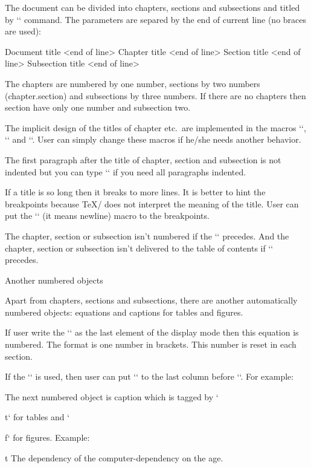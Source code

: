 The document can be divided into chapters, sections and subsections and titled
by `\tit` command. The parameters are separed by the end of current line (no
braces are used):

\begtt
\tit Document title <end of line>
\chap Chapter title <end of line>
\sec Section title <end of line>
\secc Subsection title <end of line>
\endtt

The chapters are numbered by one number, sections by two numbers
(chapter.section) and subsections by three numbers. If there are no chapters
then section have only one number and subsection two.

The implicit design of the titles of chapter etc.\ are implemented in the
macros `\printchap`, `\printsec` and `\printsecc`. User can simply change
these macros if he/she needs another behavior.

The first paragraph after the title of chapter, section and subsection is
not indented but you can type `\let\firstnoindent=\relax` if you need all
paragraphs indented.

If a title is so long then it breaks to more lines. It is better to hint the
breakpoints because \TeX/ does not interpret the meaning of the title.
User can put the `\nl` (it means newline) macro to the breakpoints.

The chapter, section or subsection isn't numbered if the `\nonum` precedes.
And the chapter, section or subsection isn't delivered to the table of
contents if `\notoc` precedes.


\sec Another numbered objects

Apart from chapters, sections and subsections, there are another
automatically numbered objects: equations and captions for tables and
figures.

If user write the `\eqmark` as the last element of the display mode then
this equation is numbered. The format is one number in brackets. This number
is reset in each section. 

If the `\eqalignno` is used, then user can put `\eqmark` to the last column
before `\cr`. For example:

\begtt
{}
\endtt

The next numbered object is caption which is tagged by `\caption/t` for
tables and `\caption/f` for figures. Example:

\begtt
\hfil{}
\par\nobreak\medskip
\caption/t The dependency of the computer-dependency on the age.
\endtt


